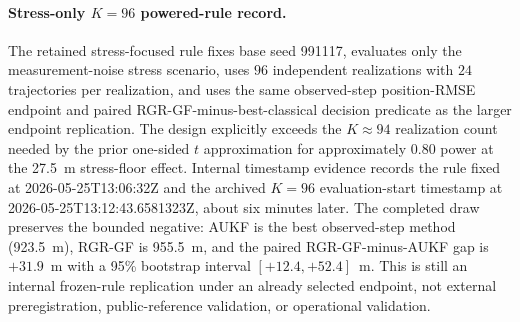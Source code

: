 \documentclass{article}
\begin{document}
\paragraph{Stress-only $K=96$ powered-rule record.}
The retained stress-focused rule fixes base seed 991117, evaluates only the measurement-noise stress scenario, uses $96$ independent realizations with $24$ trajectories per realization, and uses the same observed-step position-RMSE endpoint and paired RGR-GF-minus-best-classical decision predicate as the larger endpoint replication. The design explicitly exceeds the $K\approx94$ realization count needed by the prior one-sided $t$ approximation for approximately 0.80 power at the 27.5~m stress-floor effect. Internal timestamp evidence records the rule fixed at 2026-05-25T13:06:32Z and the archived $K=96$ evaluation-start timestamp at 2026-05-25T13:12:43.6581323Z, about six minutes later. The completed draw preserves the bounded negative: AUKF is the best observed-step method (923.5~m), RGR-GF is 955.5~m, and the paired RGR-GF-minus-AUKF gap is \(+31.9\)~m with a 95\% bootstrap interval \([+12.4,+52.4]\)~m. This is still an internal frozen-rule replication under an already selected endpoint, not external preregistration, public-reference validation, or operational validation.
\end{document}
